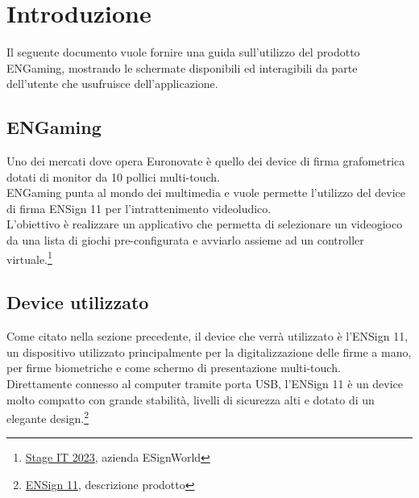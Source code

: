 \section{Introduzione}

Il seguente documento vuole fornire una guida sull'utilizzo del prodotto ENGaming, mostrando le schermate disponibili ed interagibili da parte dell'utente che usufruisce dell'applicazione.

\subsection{ENGaming}

Uno dei mercati dove opera Euronovate è quello dei device di firma grafometrica dotati di monitor da 10 pollici multi-touch.\\ 
ENGaming punta al mondo dei multimedia e vuole permette l'utilizzo del device di firma ENSign 11 per l'intrattenimento videoludico.\\ 
L'obiettivo è realizzare un applicativo che permetta di selezionare un videogioco da una lista di giochi pre-configurata e avviarlo assieme ad un controller virtuale.\footnote[1]{\href{https://www.assindustriavenetocentro.it/2023/stage-it}{Stage IT 2023}, azienda ESignWorld}

\subsection{Device utilizzato}

Come citato nella sezione precedente, il device che verrà utilizzato è l'ENSign 11, un dispositivo utilizzato principalmente per la digitalizzazione delle firme a mano, per firme biometriche e come schermo di presentazione multi-touch.\\
Direttamente connesso al computer tramite porta USB, l'ENSign 11 è un device molto compatto con grande stabilità, livelli di sicurezza alti e dotato di un elegante design.\footnote[2]{\href{https://www.euronovategroup.com/solutions/product-map/ensign-11-ensign-nfc-hardware}{ENSign 11}, descrizione prodotto}

\newpage
